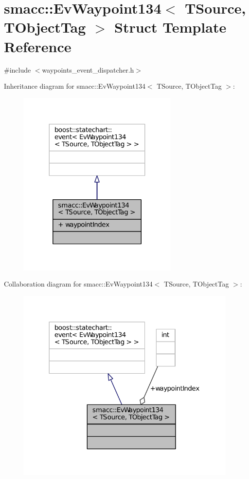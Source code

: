 \hypertarget{structsmacc_1_1EvWaypoint134}{}\section{smacc\+:\+:Ev\+Waypoint134$<$ T\+Source, T\+Object\+Tag $>$ Struct Template Reference}
\label{structsmacc_1_1EvWaypoint134}


{\ttfamily \#include $<$waypoints\+\_\+event\+\_\+dispatcher.\+h$>$}



Inheritance diagram for smacc\+:\+:Ev\+Waypoint134$<$ T\+Source, T\+Object\+Tag $>$\+:
\nopagebreak
\begin{figure}[H]
\begin{center}
\leavevmode
\includegraphics[width=227pt]{structsmacc_1_1EvWaypoint134__inherit__graph}
\end{center}
\end{figure}


Collaboration diagram for smacc\+:\+:Ev\+Waypoint134$<$ T\+Source, T\+Object\+Tag $>$\+:
\nopagebreak
\begin{figure}[H]
\begin{center}
\leavevmode
\includegraphics[width=312pt]{structsmacc_1_1EvWaypoint134__coll__graph}
\end{center}
\end{figure}
